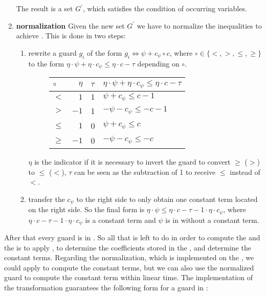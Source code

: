 \begin{enumerate}
		The result is a set $G^\prime$, which satisfies the condition of occurring variables.
	\item \textbf{normalization} \newline
		\label{algo:normalization}
		Given the new set $G^\prime$ we have to normalize the inequalities to achieve \strG. This is done in two steps:
		\begin{enumerate}
			\item rewrite a guard $g_i$ of the form $g_i \Leftrightarrow \psi + c_{\psi} \circ c$, where $\circ \in \{<,>,\le,\ge\}$ to the form $ \eta\cdot\psi + \eta\cdot c_{\psi} \le \eta\cdot c-\tau$ depending on $\circ$.\newline
			\begin{figure}[H]
				\centering
				\begin{tabular}{|l|r|l|l|}
					\hline
					$\circ$ 	& $\eta$ 	& $\tau$ 	&  $ \eta\cdot \psi + \eta\cdot c_{\psi} \le \eta\cdot c-\tau$ \\ 
					\hline \hline
					$<$ 		& $1$ 		&  $1$ 		& $\psi + c_{\psi} \le c - 1$ \\ \hline
					$>$ 		& $-1$		&  1 		& $-\psi - c_{\psi} \le -c -1 $ \\ \hline
					$\le$ 		& $1$ 		&  0 		& $\psi + c_{\psi} \le c$ \\ \hline
					$\ge$ 		& $-1$ 		&  0 		& $-\psi - c_{\psi} \le -c$ \\ \hline
				\end{tabular}
			\end{figure}
			$\eta$ is the indicator if it is necessary to invert the guard to convert $\ge$ ($>$) to $\le$ ($<$),\newline
			$\tau$ can be seen as the subtraction of 1 to receive $\le$ instead of $<$.
			\item transfer the $c_{\psi}$ to the right side to only obtain one constant term located on the right side. So the final form is $\eta\cdot \psi \le \eta\cdot c -\tau -1\cdot \eta\cdot c_{\psi}$, where $\eta\cdot c -\tau -1\cdot \eta\cdot c_{\psi}$ is a constant term and $\psi$ is in \stdLinInt without a constant term.
		\end{enumerate}
\end{enumerate}
 After that every guard is in \strG. So all that is left to do in order to compute the \guardmatrix and the \guardconstants is to apply , to determine the coefficients stored in the \guardmatrix, and determine the constant terms. \newline
 Regarding the normalization, which is implemented on the \rpntree, we could apply  to compute the constant terms, but we can also use the normalized guard to compute the constant term within linear time. The implementation of the transformation guarantees the following form for a guard in \strG:
 
